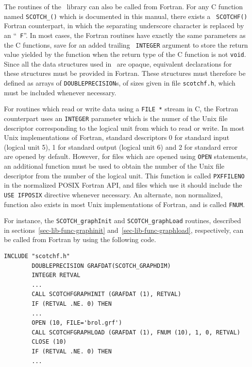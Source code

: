 The routines of the \libscotch\ library can also be called from
Fortran. For any C function named {\tt SCOTCH\_()} which is documented in this manual, there exists a {\tt
SCOTCHF()} Fortran counterpart, in which
the separating underscore character is replaced by an ``{\tt
F}''. In most cases, the Fortran routines have exactly the same
parameters as the C functions, save for an added trailing {\tt
INTEGER} argument to store the return value yielded by the function
when the return type of the C function is not {\tt void}.
\\

Since all the data structures used in \libscotch\ are
opaque, equivalent declarations for these structures must
be provided in Fortran. These structures must therefore
be defined as arrays of {\tt DOUBLEPRECISION}s, of sizes
given in file {\tt scotchf.h}, which must be included whenever
necessary.

For routines which read or write data using a {\tt FILE~*} stream
in C, the Fortran counterpart uses an {\tt INTEGER} parameter which
is the numer of the Unix file descriptor corresponding to the logical
unit from which to read or write. In most Unix implementations of
Fortran, standard descriptors 0 for standard input (logical unit 5),
1 for standard output (logical unit 6) and 2 for standard error are
opened by default. However, for files which are opened using
{\tt OPEN} statements, an additional function must be used to obtain
the number of the Unix file descriptor from the number of the logical
unit. This function is called \texttt{PXFFILENO} in the normalized
POSIX Fortran API, and files which use it should include the
\texttt{USE IFPOSIX} directive whenever necessary. An alternate, non
normalized, function also exists in most Unix implementations of
Fortran, and is called {\tt FNUM}.

For instance, the {\tt SCOTCH\_\lbt graph\lbt Init} and
{\tt SCOTCH\_\lbt graph\lbt Load} routines, described in
sections~\ref{sec-lib-func-graphinit}
and~\ref{sec-lib-func-graphload}, respectively, can
be called from Fortran by using the following code.
\begin{lstlisting}[style=language-f]
        INCLUDE "scotchf.h"
        DOUBLEPRECISION GRAFDAT(SCOTCH_GRAPHDIM)
        INTEGER RETVAL
        ...
        CALL SCOTCHFGRAPHINIT (GRAFDAT (1), RETVAL)
        IF (RETVAL .NE. 0) THEN
        ...
        OPEN (10, FILE='brol.grf')
        CALL SCOTCHFGRAPHLOAD (GRAFDAT (1), FNUM (10), 1, 0, RETVAL)
        CLOSE (10)
        IF (RETVAL .NE. 0) THEN
        ...
\end{lstlisting}

